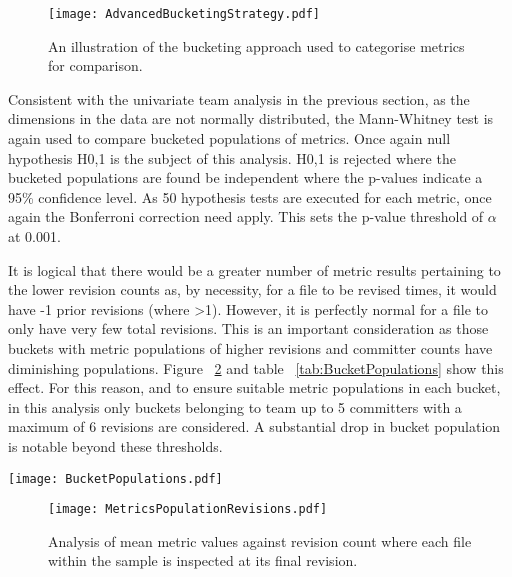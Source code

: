 \begin{figure}[htbp!] 
\centering    
\texttt{[image: AdvancedBucketingStrategy.pdf]}
\caption{An illustration of the bucketing approach used to categorise metrics for comparison.}
\label{fig:AdvancedBucketingStrategy}
\end{figure}
	
Consistent with the univariate team analysis in the previous section, as the dimensions in the data are not normally distributed, the Mann-Whitney test is again used to compare bucketed populations of metrics. Once again null hypothesis H0,1 is the subject of this analysis. H0,1 is rejected where the bucketed populations are found be independent where the p-values indicate a 95\% confidence level. As 50 hypothesis tests are executed for each metric, once again the Bonferroni correction need apply. This sets the p-value threshold of $\alpha$ at 0.001.

It is logical that there would be a greater number of metric results pertaining to the lower revision counts as, by necessity, for a file to be revised  times, it would have -1 prior revisions (where >1). However, it is perfectly normal for a file to only have very few total revisions. This is an important consideration as those buckets with metric populations of higher revisions and committer counts have diminishing populations. Figure ~\ref{fig:MetricsPopulationRevisions} and table ~\ref{tab:BucketPopulations} show this effect. For this reason, and to ensure suitable metric populations in each bucket, in this analysis only buckets belonging to team up to 5 committers with a maximum of 6 revisions are considered. A substantial drop in bucket population is notable beyond these thresholds.

\begin{table}
\centering 
{}
\begin{tabular}
 \centering 
 \texttt{[image: BucketPopulations.pdf]}
 \label{tab:BucketPopulations}
\end{tabular}
\end{table}

\begin{figure}[htbp!] 
\centering    
\texttt{[image: MetricsPopulationRevisions.pdf]}
\caption{Analysis of mean metric values against revision count where each file within the sample is inspected at its final revision.}
\label{fig:MetricsPopulationRevisions}
\end{figure}

